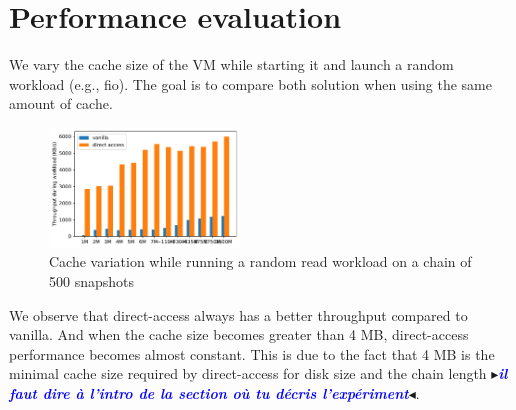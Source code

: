 \documentclass[sigplan,screen,10pt]{acmart}
\newcommand{\mynote}[2]{\fbox{\bfseries\sffamily\footnotesize{\textbf{#1}}}
 {\small$\blacktriangleright$\textsf{\emph{#2}}$\blacktriangleleft$}}
\newcommand{\mynote}[2]{}
\newcommand{\stella}[1]{\mynote{\textcolor{red}{Stella}}{\textcolor{blue}{\textbf{#1}}}}
\begin{document}

	\section*{Performance evaluation}
	
	We vary the cache size of the VM while starting it and launch a random workload (e.g., fio).
	The goal is to compare both solution when using the same amount of cache. 
	
	\begin{figure}[h]
		\center
		\includegraphics[width=0.45\textwidth]{cache_variation.pdf}
		\caption{Cache variation while running a random read workload on a chain of 500 snapshots}
		\label{fig:fig-c}
	\end{figure}

	We observe that direct-access always has a better throughput compared to vanilla.
	And when the cache size becomes greater than 4 MB, direct-access performance becomes almost constant. 
	This is due to the fact that 4 MB is the minimal cache size required by direct-access for disk size and the chain length \stella{il faut dire à l'intro de la section où tu décris l'expériment}.
	
\end{document}
